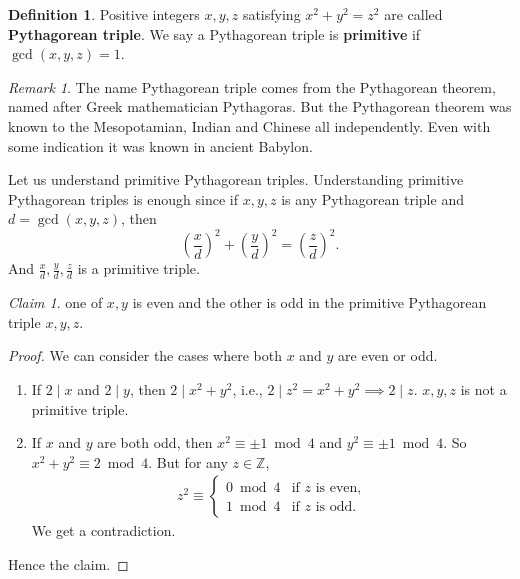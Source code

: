 \documentclass{amsbook}
\theoremstyle{plain}
\theoremstyle{definition}
\newtheorem{definition}[theorem]{Definition}
\theoremstyle{remark}
\newtheorem{remark}[theorem]{Remark}
\newtheorem{claim}[theorem]{Claim}
\numberwithin{equation}{chapter}
\numberwithin{figure}{chapter}
\newcommand{\Z}{\mathbb{Z}}
\begin{document}
\begin{definition}
  Positive integers $x, y, z$ satisfying $x^2 + y^2 = z^2$ are called \textbf{Pythagorean triple}. We say a Pythagorean triple is \textbf{primitive} if $\gcd (x, y, z) = 1$. 
\end{definition}
\begin{remark}
  The name Pythagorean triple comes from the Pythagorean theorem, named after Greek mathematician Pythagoras. But the Pythagorean theorem was known to the Mesopotamian, Indian and Chinese all independently. Even with some indication it was known in ancient Babylon. 
\end{remark}

Let us understand primitive Pythagorean triples. Understanding primitive Pythagorean triples is enough since if $x, y, z$ is any Pythagorean triple and $d = \gcd (x, y, z)$, then 
\[
\left( \frac{x}d \right)^2 + \left( \frac{y}d \right)^2 = \left( \frac{z}d \right)^2.
\]
And $\frac{x}d, \frac{y}d, \frac{z}d$ is a primitive triple.

\begin{claim}\label{clm:1odd_1even_pythagorean_triple}
  one of $x,y$ is even and the other is odd in the primitive Pythagorean triple $x, y, z$.
\end{claim}
\begin{proof}
  We can consider the cases where both $x$ and $y$ are even or odd.
  \begin{enumerate}[label=(\roman*)]
  \item If $2 \mid x$ and $2 \mid y$, then $2 \mid x^2 + y^2$, i.e., $2 \mid z^2 = x^2 + y^2 \implies 2 \mid z$. $x, y, z$ is not a primitive triple.
  \item If $x$ and $y$ are both odd, then $x^2 \equiv \pm 1 \bmod 4$ and $y^2 \equiv \pm 1 \bmod 4$. So $x^2 + y^2 \equiv 2 \bmod 4$. But for any $z \in \Z$, 
    \begin{align}
      z^2 \equiv \left\{ \begin{array}{ll}
          0 \bmod 4 & \text{if $z$ is even,} \\[1mm]
          1 \bmod 4 & \text{if $z$ is odd.} 
        \end{array} \right.
    \end{align}
    We get a contradiction.
  \end{enumerate}
  
  Hence the claim.
\end{proof}
\end{document}
